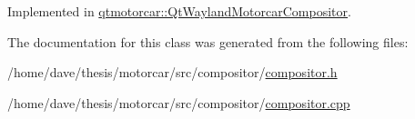 Implemented in \hyperlink{classqtmotorcar_1_1QtWaylandMotorcarCompositor_a9e29a67d95d6aa74a08b2a3deed19dfe}{qtmotorcar\-::\-Qt\-Wayland\-Motorcar\-Compositor}.



The documentation for this class was generated from the following files\-:\begin{DoxyCompactItemize}
\item 
/home/dave/thesis/motorcar/src/compositor/\hyperlink{compositor_8h}{compositor.\-h}\item 
/home/dave/thesis/motorcar/src/compositor/\hyperlink{compositor_8cpp}{compositor.\-cpp}\end{DoxyCompactItemize}
